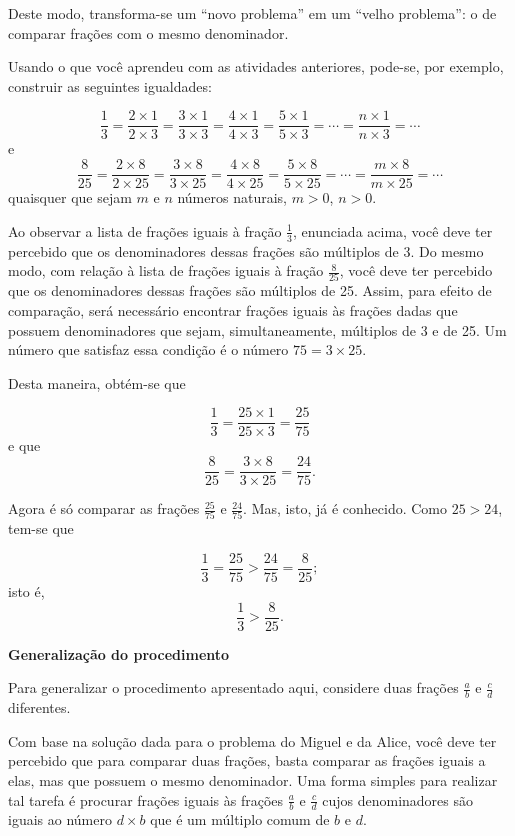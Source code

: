 Deste modo, transforma-se um ``novo problema'' em um ``velho problema'': o de comparar frações com o mesmo denominador.

Usando o que você aprendeu com as atividades anteriores, pode-se, por e\-xemplo, construir as seguintes igualdades:

$$\dfrac{1}{3} = \dfrac{2 \times 1}{2 \times 3} = \dfrac{3 \times 1}{3 \times 3} = \dfrac{4 \times 1}{4 \times 3} = \dfrac{5 \times 1}{5 \times 3} = \cdots = \dfrac{n \times 1}{n\times 3} = \cdots$$
e
$$\dfrac{8}{25} = \dfrac{2 \times 8}{2 \times 25} = \dfrac{3 \times 8}{3 \times 25} = \dfrac{4 \times 8}{4 \times 25} = \dfrac{5 \times 8}{5 \times 25} = \cdots = \dfrac{m \times 8}{m\times 25} = \cdots$$
quaisquer que sejam $m$ e $n$ números naturais, $m > 0$, $n > 0$.

Ao observar a lista de frações iguais à fração $\frac{1}{3}$, enunciada acima, você deve ter percebido que os denominadores dessas frações são múltiplos de 3.  Do mesmo modo, com relação à lista de frações iguais à fração $\frac{8}{25}$, você deve ter percebido que os denominadores dessas frações são múltiplos de 25. Assim, para efeito de comparação, será necessário encontrar frações iguais às frações dadas que possuem denominadores que sejam, simultaneamente, múltiplos de 3 e de 25. Um número que satisfaz essa condição é o número $75 = 3 \times 25$.

Desta maneira, obtém-se que

$$\dfrac{1}{3} = \dfrac{25 \times 1}{25 \times 3} = \dfrac{25}{75}$$
e que
$$\dfrac{8}{25} = \dfrac{3 \times 8}{3 \times 25} = \dfrac{24}{75}.$$

Agora é só comparar as frações $\frac{25}{75}$ e $\frac{24}{75}$. Mas, isto, já é conhecido.
Como $25 > 24$, tem-se que

$$\dfrac{1}{3} = \dfrac{25}{75} > \dfrac{24}{75} =  \dfrac{8}{25};$$
isto é,
$$\dfrac{1}{3} > \dfrac{8}{25}.$$

{\bfseries Generalização do procedimento}

Para generalizar o procedimento apresentado aqui, considere duas frações $\frac{a}{b}$ e $\frac{c}{d}$ diferentes.

Com base na solução dada para o problema do Miguel e da Alice, você deve ter percebido que para comparar duas frações, basta comparar as frações iguais a elas, mas que possuem o mesmo denominador. Uma forma simples para realizar tal tarefa é procurar frações iguais às frações  $\frac{a}{b}$ e $\frac{c}{d}$ cujos denominadores são iguais ao número $d\times b$ que é um múltiplo comum de $b$ e $d$.

